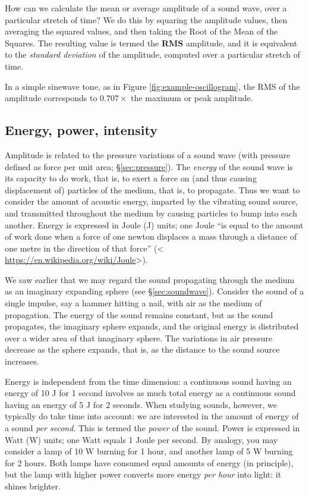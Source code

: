 \documentclass[
]{book}
\begin{document}
How can we calculate the mean or average amplitude of a sound wave, over a particular stretch of time? We do this by squaring the amplitude values, then averaging the squared values, and then taking the Root of the Mean of the Squares. The resulting value is termed the \textbf{RMS} amplitude, and it is equivalent to the \emph{standard deviation} of the amplitude, computed over a particular stretch of time.

In a simple sinewave tone, as in Figure \ref{fig:example-oscillogram}, the RMS of the amplitude corresponds to \(0.707 \times\) the maximum or peak amplitude.

\subsection{Energy, power, intensity}\label{sec:intensity}

Amplitude is related to the pressure variations of a sound wave (with pressure defined as force per unit area; §\ref{sec:pressure}). The \emph{energy} of the sound wave is its capacity to do work, that is, to exert a force on (and thus causing displacement of) particles of the medium, that is, to propagate. Thus we want to consider the amount of acoustic energy, imparted by the vibrating sound source, and transmitted throughout the medium by causing particles to bump into each another. Energy is expressed in Joule (J) units; one Joule ``is equal to the amount of work done when a force of one newton displaces a mass through a distance of one metre in the direction of that force'' (\textless{} \url{https://en.wikipedia.org/wiki/Joule}\textgreater).

We saw earlier that we may regard the sound propagating through the medium as an imaginary expanding sphere (see §\ref{sec:soundwave}). Consider the sound of a single impulse, say a hammer hitting a nail, with air as the medium of propagation. The energy of the sound remains constant, but as the sound propagates, the imaginary sphere expands, and the original energy is distributed over a wider area of that imaginary sphere. The variations in air pressure decrease as the sphere expands, that is, as the distance to the sound source increases.

Energy is independent from the time dimension: a continuous sound having an energy of 10 J for 1 second involves as much total energy as a continuous sound having an energy of 5 J for 2 seconds. When studying sounds, however, we typically do take time into account: we are interested in the amount of energy of a sound \emph{per second}. This is termed the \emph{power} of the sound. Power is expressed in Watt (W) units; one Watt equals 1 Joule per second. By analogy, you may consider a lamp of 10 W burning for 1 hour, and another lamp of 5 W burning for 2 hours. Both lamps have consumed equal amounts of energy (in principle), but the lamp with higher power converts more energy \emph{per hour} into light: it shines brighter.
\end{document}
